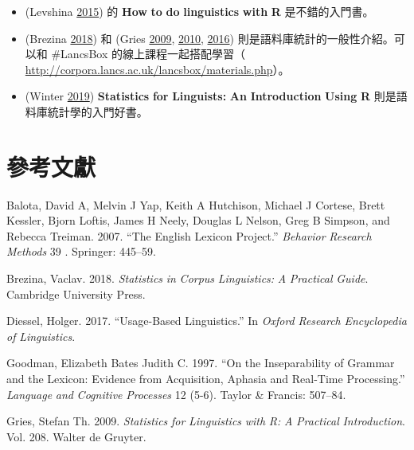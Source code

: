 \begin{itemize}
\item (Levshina \hyperlink{bookmarkid3tbugp1}{2015}) 的 \textbf{How} \textbf{to} \textbf{do} \textbf{linguistics} \textbf{with} \textbf{R} 是不錯的入門書。

\item (Brezina \hyperlink{bookmarkid41mghml}{2018}) 和 (Gries \hyperlink{bookmarkid3fwokq0}{2009}, \hyperlink{bookmarkid1v1yuxt}{2010}, \hyperlink{bookmarkid4f1mdlm}{2016}) 則是語料庫統計的一般性介紹。可以和 \#LancsBox 的線上課程一起搭配學習（ \url{http://corpora.lancs.ac.uk/lancsbox/materials.php}）。

\item (Winter \hyperlink{bookmarkid46r0co2}{2019}) \textbf{Statistics} \textbf{for} \textbf{Linguists:} \textbf{An} \textbf{Introduction} \textbf{Using} \textbf{R} 則是語料庫統計學的入門好書。

\end{itemize}
\section{參考文獻}

\hypertarget{bookmarkid32hioqz}{}Balota, David A, Melvin J Yap, Keith A Hutchison, Michael J Cortese, Brett Kessler,   Bjorn Loftis, James H Neely, Douglas L Nelson, Greg B Simpson, and Rebecca Treiman. 2007. “The English Lexicon Project.” \textit{Behavior} \textit{Research} \textit{Methods} 39 . Springer: 445–59.

\hypertarget{bookmarkid41mghml}{}Brezina, Vaclav. 2018. \textit{Statistics} \textit{in} \textit{Corpus} \textit{Linguistics:} \textit{A} \textit{Practical} \textit{Guide}. Cambridge University Press.

\hypertarget{bookmarkid2grqrue}{}Diessel, Holger. 2017. “Usage-Based Linguistics.” In \textit{Oxford} \textit{Research} \textit{Encyclopedia} \textit{of} \textit{Linguistics}.

\hypertarget{bookmarkidvx1227}{}Goodman, Elizabeth Bates Judith C. 1997. “On the Inseparability of Grammar and the Lexicon: Evidence from Acquisition, Aphasia and Real-Time Processing.” \textit{Language} \textit{and} \textit{Cognitive} \textit{Processes} 12 (5-6). Taylor \& Francis: 507–84.

\hypertarget{bookmarkid3fwokq0}{}Gries, Stefan Th. 2009. \textit{Statistics} \textit{for} \textit{Linguistics} \textit{with} \textit{R:} \textit{A} \textit{Practical} \textit{Introduction}. Vol. 208. Walter de Gruyter.

